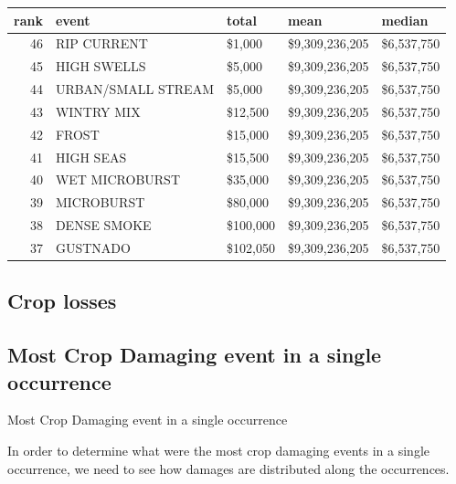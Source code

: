 \documentclass[]{article}
\begin{document}
\begin{longtable}[]{@{}rllll@{}}
\toprule
rank & event & total & mean & median\tabularnewline
\midrule
\endhead
46 & RIP CURRENT & \$1,000 & \$9,309,236,205 &
\$6,537,750\tabularnewline
45 & HIGH SWELLS & \$5,000 & \$9,309,236,205 &
\$6,537,750\tabularnewline
44 & URBAN/SMALL STREAM & \$5,000 & \$9,309,236,205 &
\$6,537,750\tabularnewline
43 & WINTRY MIX & \$12,500 & \$9,309,236,205 &
\$6,537,750\tabularnewline
42 & FROST & \$15,000 & \$9,309,236,205 & \$6,537,750\tabularnewline
41 & HIGH SEAS & \$15,500 & \$9,309,236,205 & \$6,537,750\tabularnewline
40 & WET MICROBURST & \$35,000 & \$9,309,236,205 &
\$6,537,750\tabularnewline
39 & MICROBURST & \$80,000 & \$9,309,236,205 &
\$6,537,750\tabularnewline
38 & DENSE SMOKE & \$100,000 & \$9,309,236,205 &
\$6,537,750\tabularnewline
37 & GUSTNADO & \$102,050 & \$9,309,236,205 & \$6,537,750\tabularnewline
\bottomrule
\end{longtable}

\subsection{Crop losses}\label{crop-losses}

\subsection{Most Crop Damaging event in a single
occurrence}\label{most-crop-damaging-event-in-a-single-occurrence}

Most Crop Damaging event in a single occurrence

In order to determine what were the most crop damaging events in a
single occurrence, we need to see how damages are distributed along the
occurrences.
\end{document}
